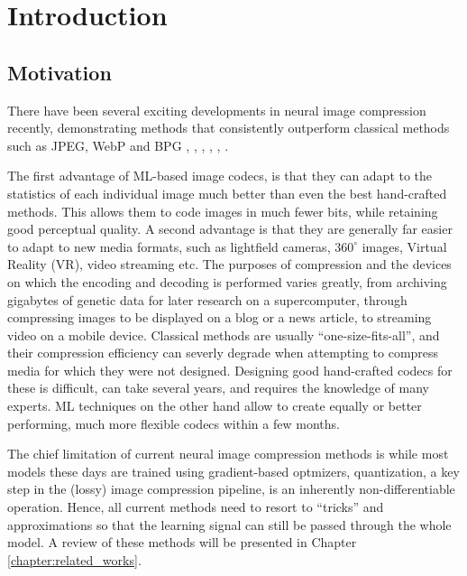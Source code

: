 \chapter{Introduction}

\section{Motivation}
\par
There have been several exciting developments in neural image compression
recently, demonstrating methods that consistently outperform classical methods
such as JPEG, WebP and BPG \cite{toderici2017full}, \cite{theis2017lossy},
\cite{rippel2017real}, \cite{balle2018variational}, \cite{johnston2018cvpr},
\cite{mentzer2018cvpr}.

\par
The first advantage of ML-based image codecs, is that they can adapt to the
statistics of each individual image much better than even the best hand-crafted
methods. This allows them to code images in much fewer bits, while retaining good
perceptual quality. A second advantage is that they are generally far easier to
adapt to new media formats, such as lightfield cameras, $360^\circ$ images,
Virtual Reality (VR), video streaming etc. The purposes of compression and the
devices on which the encoding and decoding is performed varies greatly, from
archiving gigabytes of genetic data for later research on a supercomputer,
through compressing images to be displayed on a blog or a news article, to
streaming video on a mobile device. Classical methods are usually
``one-size-fits-all'', and their compression efficiency can severly degrade when
attempting to compress media for which they were not designed. Designing good
hand-crafted codecs for these is difficult, can take several years, and
requires the knowledge of many experts. ML techniques on the other hand allow to
create equally or better performing, much more flexible codecs within a few months.

\par
The chief limitation of current neural image compression methods is while most
models these days are trained using gradient-based optmizers, quantization, a
key step in the (lossy) image compression pipeline, is an inherently
non-differentiable operation. Hence, all current methods need to resort to
``tricks'' and approximations so that the learning signal can still be passed
through the whole model. A review of these methods will be presented in Chapter 
\ref{chapter:related_works}.

